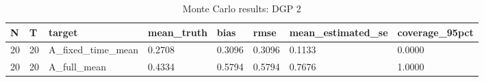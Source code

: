 \begin{table}[!htbp]
\centering
\caption{Monte Carlo results: DGP 2}
\label{tab:mc-dgp2}
\begin{tabular}{llllllll}
\toprule
N & T & target & mean\_truth & bias & rmse & mean\_estimated\_se & coverage\_95pct \\
\midrule
20 & 20 & A\_fixed\_time\_mean & 0.2708 & 0.3096 & 0.3096 & 0.1133 & 0.0000 \\
20 & 20 & A\_full\_mean & 0.4334 & 0.5794 & 0.5794 & 0.7676 & 1.0000 \\
\bottomrule
\end{tabular}
\end{table}
